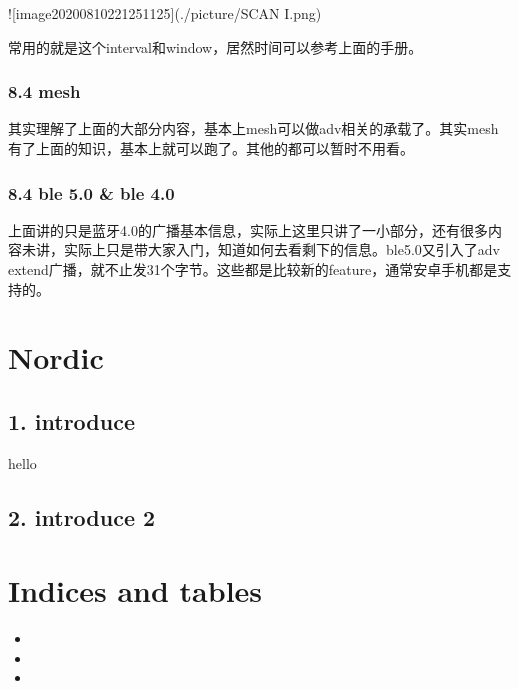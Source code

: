 \documentclass[letterpaper,10pt,english]{sphinxmanual}
\begin{document}
!{[}image\sphinxhyphen{}20200810221251125{]}(./picture/SCAN I.png)

常用的就是这个interval和window，居然时间可以参考上面的手册。


\subsection{8.4 mesh}
\label{\detokenize{test/ble_adv_scan_all:mesh}}
其实理解了上面的大部分内容，基本上mesh可以做adv相关的承载了。其实mesh有了上面的知识，基本上就可以跑了。其他的都可以暂时不用看。


\subsection{8.4 ble 5.0 \& ble 4.0}
\label{\detokenize{test/ble_adv_scan_all:ble-5-0-ble-4-0}}
上面讲的只是蓝牙4.0的广播基本信息，实际上这里只讲了一小部分，还有很多内容未讲，实际上只是带大家入门，知道如何去看剩下的信息。ble5.0又引入了adv extend广播，就不止发31个字节。这些都是比较新的feature，通常安卓手机都是支持的。


\chapter{Nordic}
\label{\detokenize{nordic/nordic_nrf5x:nordic}}\label{\detokenize{nordic/nordic_nrf5x::doc}}

\section{1. introduce}
\label{\detokenize{nordic/nordic_nrf5x:introduce}}
hello


\section{2. introduce 2}
\label{\detokenize{nordic/nordic_nrf5x:introduce-2}}

\chapter{Indices and tables}
\label{\detokenize{index:indices-and-tables}}\begin{itemize}
\item {} 

\item {} 

\item {} 

\end{itemize}



\renewcommand{\indexname}{索引}
\printindex
\end{document}
